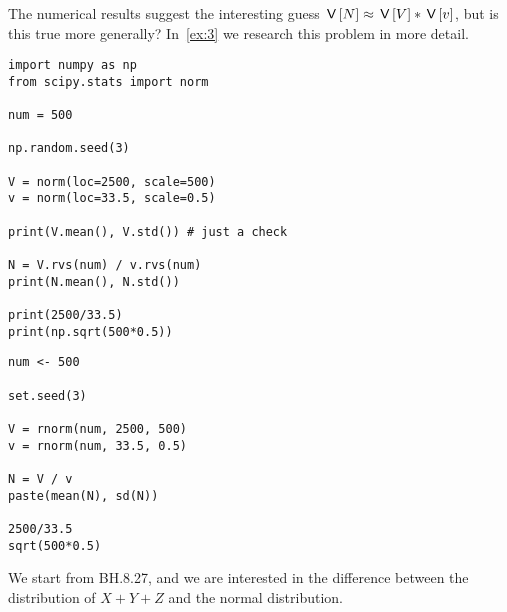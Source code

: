 \documentclass[assignments]{subfiles}
\begin{document}
\begin{exercise}
The numerical results suggest the interesting guess $\,\mathsf{V}\left[N\right] \approx \,\mathsf{V}\left[V\right] * \,\mathsf{V}\left[v\right]$, but  is this true more generally? In~\cref{ex:3} we research this problem in more detail.

\begin{verbatim}
import numpy as np
from scipy.stats import norm

num = 500

np.random.seed(3)

V = norm(loc=2500, scale=500)
v = norm(loc=33.5, scale=0.5)

print(V.mean(), V.std()) # just a check

N = V.rvs(num) / v.rvs(num)
print(N.mean(), N.std())

print(2500/33.5)
print(np.sqrt(500*0.5))
\end{verbatim}

\begin{verbatim}
num <- 500

set.seed(3)

V = rnorm(num, 2500, 500)
v = rnorm(num, 33.5, 0.5)

N = V / v
paste(mean(N), sd(N))

2500/33.5
sqrt(500*0.5)
\end{verbatim}
\end{exercise}

\begin{exercise}
We start from BH.8.27, and we are interested in the difference between the distribution of $X+Y+Z$ and the normal distribution.

\begin{solution}
\end{solution}
\end{exercise}
\end{document}
